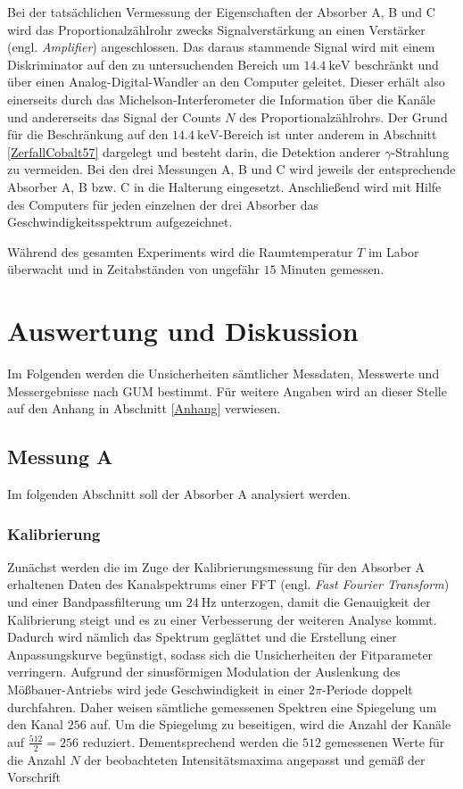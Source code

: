 \documentclass[
a4paper,                %
titlepage=firstiscover, %
captions=tableheading,  %
toc=bibliography,       %
toc=listof,             %
oneside,                %
automark,               %
12pt,                   %
english, ngerman,       %
parskip = half,         %
]{scrartcl}
\begin{document}
Bei der tatsächlichen Vermessung der Eigenschaften der Absorber A, B und C wird das Proportionalzählrohr zwecks Signalverstärkung an einen Verstärker (engl. \emph{Amplifier}) angeschlossen.
Das daraus stammende Signal wird mit einem Diskriminator auf den zu untersuchenden Bereich um $\SI{14,4}{\kilo\electronvolt}$ beschränkt und über einen Analog-Digital-Wandler an den Computer geleitet.
Dieser erhält also einerseits durch das Michelson-Interferometer die Information über die Kanäle und andererseits das Signal der Counts $N$ des Proportionalzählrohrs.
Der Grund für die Beschränkung auf den $\SI{14,4}{\kilo\electronvolt}$-Bereich ist unter anderem in Abschnitt \ref{ZerfallCobalt57} dargelegt und besteht darin, die Detektion anderer $\gamma$-Strahlung zu vermeiden.
Bei den drei Messungen A, B und C wird jeweils der entsprechende Absorber A, B bzw. C in die Halterung eingesetzt.
Anschließend wird mit Hilfe des Computers für jeden einzelnen der drei Absorber das Geschwindigkeitsspektrum aufgezeichnet.

Während des gesamten Experiments wird die Raumtemperatur $T$ im Labor überwacht und in Zeitabständen von ungefähr $15$ Minuten gemessen.


\newpage


\section{Auswertung und Diskussion} \label{AuswertungDiskussion}

Im Folgenden werden die Unsicherheiten sämtlicher Messdaten, Messwerte und Messergebnisse nach GUM\cite{1} bestimmt.
Für weitere Angaben wird an dieser Stelle auf den Anhang in Abschnitt \ref{Anhang} verwiesen.

\subsection{Messung A}

Im folgenden Abschnitt soll der Absorber A analysiert werden.

\subsubsection{Kalibrierung} \label{KaliMessungA}

Zunächst werden die im Zuge der Kalibrierungsmessung für den Absorber A erhaltenen Daten des Kanalspektrums einer FFT (engl. \emph{Fast Fourier Transform}) und einer Bandpassfilterung um $\SI{24}{\hertz}$ unterzogen, damit die Genauigkeit der Kalibrierung steigt und es zu einer Verbesserung der weiteren Analyse kommt.
Dadurch wird nämlich das Spektrum geglättet und die Erstellung einer Anpassungskurve begünstigt, sodass sich die Unsicherheiten der Fitparameter verringern.
Aufgrund der sinusförmigen Modulation der Auslenkung des Mößbauer-Antriebs wird jede Geschwindigkeit in einer $2\pi$-Periode doppelt durchfahren.
Daher weisen sämtliche gemessenen Spektren eine Spiegelung um den Kanal $256$ auf.
Um die Spiegelung zu beseitigen, wird die Anzahl der Kanäle auf $\frac{512}{2}=256$ reduziert.
Dementsprechend werden die $512$ gemessenen Werte für die Anzahl $N$ der beobachteten Intensitätsmaxima angepasst und gemäß der Vorschrift
\end{document}
